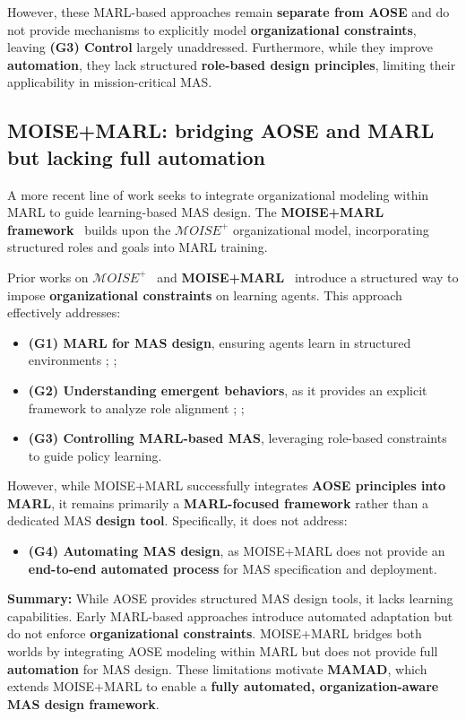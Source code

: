 \documentclass[pdflatex,sn-mathphys-num]{sn-jnl}%
\theoremstyle{thmstyleone}%
\theoremstyle{thmstyletwo}%
\theoremstyle{thmstylethree}%
\begin{document}
However, these MARL-based approaches remain \textbf{separate from AOSE} and do not provide mechanisms to explicitly model \textbf{organizational constraints}, leaving \textbf{(G3) Control} largely unaddressed. Furthermore, while they improve \textbf{automation}, they lack structured \textbf{role-based design principles}, limiting their applicability in mission-critical MAS.

\subsection{MOISE+MARL: bridging AOSE and MARL but lacking full automation}

A more recent line of work seeks to integrate organizational modeling within MARL to guide learning-based MAS design. The \textbf{MOISE+MARL framework}~\cite{soule2025moisemarl} builds upon the \textbf{$\mathcal{M}OISE^+$} organizational model, incorporating structured roles and goals into MARL training. 

Prior works on $\mathcal{M}OISE^+$~\cite{hubner2007moise} and \textbf{MOISE+MARL}~\cite{soule2025moisemarl} introduce a structured way to impose \textbf{organizational constraints} on learning agents. This approach effectively addresses:
%
\begin{itemize}
    \item \textbf{(G1) MARL for MAS design}, ensuring agents learn in structured environments ; ;
    \item \textbf{(G2) Understanding emergent behaviors}, as it provides an explicit framework to analyze role alignment ; ;
    \item \textbf{(G3) Controlling MARL-based MAS}, leveraging role-based constraints to guide policy learning.
\end{itemize}

However, while MOISE+MARL successfully integrates \textbf{AOSE principles into MARL}, it remains primarily a \textbf{MARL-focused framework} rather than a dedicated MAS \textbf{design tool}. Specifically, it does not address:
%
\begin{itemize}
    \item \textbf{(G4) Automating MAS design}, as MOISE+MARL does not provide an \textbf{end-to-end automated process} for MAS specification and deployment.
\end{itemize}

\medskip

\noindent \textbf{Summary:} While AOSE provides structured MAS design tools, it lacks learning capabilities. Early MARL-based approaches introduce automated adaptation but do not enforce \textbf{organizational constraints}. MOISE+MARL bridges both worlds by integrating AOSE modeling within MARL but does not provide full \textbf{automation} for MAS design. These limitations motivate \textbf{MAMAD}, which extends MOISE+MARL to enable a \textbf{fully automated, organization-aware MAS design framework}.
\end{document}
